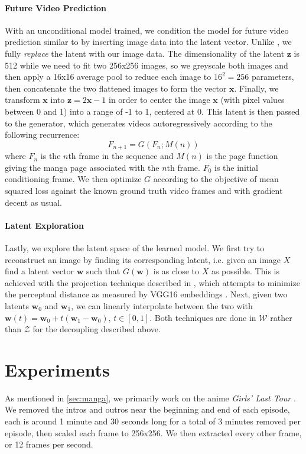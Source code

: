 \documentclass[11pt, oneside]{article}
\begin{document}
\paragraph{Future Video Prediction}
With an unconditional model trained, we condition the model for future video
prediction similar to \cite{scene} by inserting image data into the latent
vector. Unlike \cite{scene}, we fully \textit{replace} the latent with our
image data. The dimensionality of the latent \( \bm{z} \) is 512 while we
need to fit two 256x256 images, so we greyscale both images and then apply a
16x16 average pool to reduce each image to \( 16^2 = 256 \) parameters, then
concatenate the two flattened images to form the vector \( \bm{x} \). Finally,
we transform \( \bm{x} \) into \( \bm{z} = 2 \bm{x} - 1 \) in order to center
the image \( \bm{x} \) (with pixel values between 0 and 1) into a range of
-1 to 1, centered at 0. This latent is then passed to the generator, which
generates videos autoregressively according to the following recurrence:
\[ F_{n + 1} = G(F_n; M(n)) \]
where \( F_n \) is the \( n \)th frame in the sequence and \( M(n) \) is the
page function giving the manga page associated with the \( n \)th frame. \(
F_0 \) is the initial conditioning frame. We then optimize \( G \) according
to the objective of mean squared loss against the known ground truth video
frames and with gradient decent as usual.

\paragraph{Latent Exploration}
Lastly, we explore the latent space of the learned model. We first try to
reconstruct an image by finding its corresponding latent, i.e. given an
image \( X \) find a latent vector \( \bm{w} \) such that \( G(\bm{w}) \)
is as close to \( X \) as possible. This is achieved with the projection
technique described in \cite{stylegan2}, which attempts to minimize the
perceptual distance as measured by VGG16 embeddings \cite{stylegan2, vgg}.
Next, given two latents \( \bm{w}_0 \) and \( \bm{w}_1 \), we can linearly
interpolate between the two with \( \bm{w}(t) = \bm{w}_0 + t (\bm{w}_1 -
\bm{w}_0) \), \( t \in [0, 1] \). Both techniques are done in \( \mathcal{W}
\) rather than \( \mathcal{Z} \) for the decoupling described above.

\section{Experiments}
As mentioned in \autoref{sec:manga}, we primarily work on the anime
\textit{Girls' Last Tour} \cite{tour}. We removed the intros and outros near
the beginning and end of each episode, each is around 1 minute and 30 seconds
long for a total of 3 minutes removed per episode, then scaled each frame
to 256x256. We then extracted every other frame, or 12 frames per second.
\end{document}
